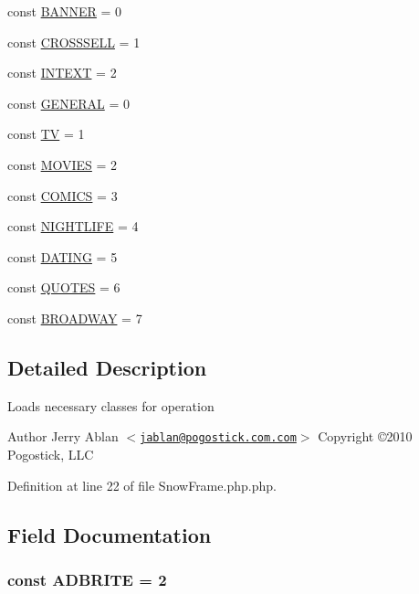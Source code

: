 \begin{DoxyCompactItemize}
\item 
const \hyperlink{classSnowFrame_a18f4ddb3eef5b182fc8723b1dcbb8a0d}{BANNER} = 0
\item 
const \hyperlink{classSnowFrame_a775a9786534a937a818bc5f089d4682b}{CROSSSELL} = 1
\item 
const \hyperlink{classSnowFrame_a60407e5219abaa0cca0dccfa4e4e462d}{INTEXT} = 2
\item 
const \hyperlink{classSnowFrame_ae5543f52532ef1f6a46495bd50779af6}{GENERAL} = 0
\item 
const \hyperlink{classSnowFrame_a6a68687bdbfddcd5ae897171fa9a2424}{TV} = 1
\item 
const \hyperlink{classSnowFrame_a93d4b4a3ec8c210f3bc1c68347a0842d}{MOVIES} = 2
\item 
const \hyperlink{classSnowFrame_a4d9941e5c8b25e9686422a9660c8e7e2}{COMICS} = 3
\item 
const \hyperlink{classSnowFrame_a407090c71b40f525e5cc7fbb6745278b}{NIGHTLIFE} = 4
\item 
const \hyperlink{classSnowFrame_a758179882b25299240e0d4e2594e5738}{DATING} = 5
\item 
const \hyperlink{classSnowFrame_ac7f8047fe65a35c174373c065d92e404}{QUOTES} = 6
\item 
const \hyperlink{classSnowFrame_a030fa57e72ac5408f131217b16a0c321}{BROADWAY} = 7
\end{DoxyCompactItemize}


\subsection{Detailed Description}
Loads necessary classes for operation

\begin{DoxyAuthor}{Author}
Jerry Ablan $<$\href{mailto:jablan@pogostick.com.com}{\tt jablan@pogostick.com.com}$>$  Copyright \copyright 2010 Pogostick, LLC 
\end{DoxyAuthor}


Definition at line 22 of file SnowFrame.php.php.



\subsection{Field Documentation}
\hypertarget{classSnowFrame_a0cd22078135ae883abf2a66b3a2e060f}{
\subsubsection[{ADBRITE}]{\setlength{\rightskip}{0pt plus 5cm}const {\bf ADBRITE} = 2}}
\label{classSnowFrame_a0cd22078135ae883abf2a66b3a2e060f}


